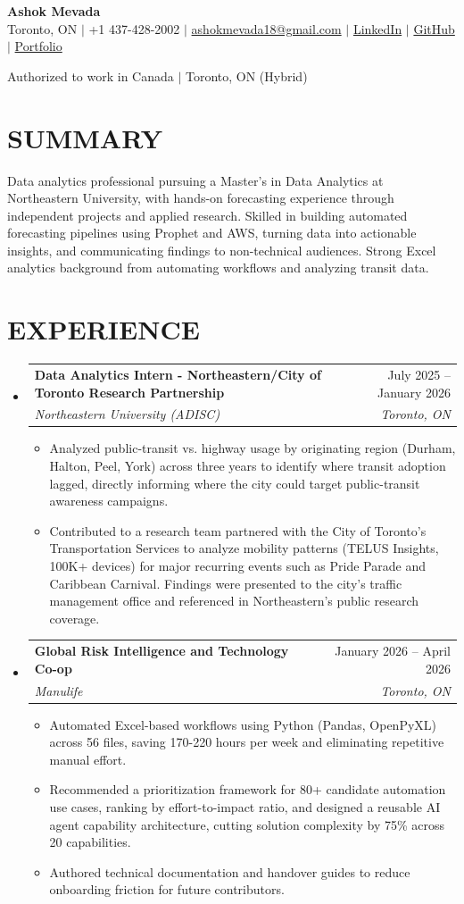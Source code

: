 \documentclass[letterpaper,11pt]{article}
\makeatletter
\newcommand{\resumeItem}[1]{\item{#1 \vspace{-2pt}}}
\newcommand{\resumeSubheading}[4]{
  \vspace{-2pt}\item
    \begin{tabular*}{0.97\textwidth}[t]{l@{\extracolsep{\fill}}r}
      \textbf{#1} & #2 \\
      \textit{#3} & \textit{#4} \\
    \end{tabular*}\vspace{-7pt}
}
\newcommand{\resumeSubHeadingListStart}{\begin{itemize}[leftmargin=0pt, label={}]}
\newcommand{\resumeSubHeadingListEnd}{\end{itemize}}
\newcommand{\resumeItemListStart}{\begin{itemize}[leftmargin=0.2in, label={$\bullet$}]}
\newcommand{\resumeItemListEnd}{\end{itemize}\vspace{-5pt}}
\makeatother
\begin{document}
\begin{center}
    {\Huge \textbf{Ashok Mevada}} \\[6pt]
    Toronto, ON $|$ +1 437-428-2002 $|$ \href{mailto:ashokmevada18@gmail.com}{ashokmevada18@gmail.com} $|$ \href{https://linkedin.com/in/ashokmevada}{LinkedIn} $|$ \href{https://github.com/Ashokmevada}{GitHub} $|$ \href{https://ashokmevada.online}{Portfolio}
\end{center}

\begin{center}
    \small Authorized to work in Canada $|$ Toronto, ON (Hybrid)
\end{center}

\section*{\MakeUppercase{Summary}}
Data analytics professional pursuing a Master's in Data Analytics at Northeastern University, with hands-on forecasting experience through independent projects and applied research. Skilled in building automated forecasting pipelines using Prophet and AWS, turning data into actionable insights, and communicating findings to non-technical audiences. Strong Excel analytics background from automating workflows and analyzing transit data.

\section{\MakeUppercase{Experience}}
\resumeSubHeadingListStart
\resumeSubheading
  {Data Analytics Intern - Northeastern/City of Toronto Research Partnership}{July 2025 -- January 2026}
  {Northeastern University (ADISC)}{Toronto, ON}
\resumeItemListStart
  \resumeItem{Analyzed public-transit vs. highway usage by originating region (Durham, Halton, Peel, York) across three years to identify where transit adoption lagged, directly informing where the city could target public-transit awareness campaigns.}
  \resumeItem{Contributed to a research team partnered with the City of Toronto's Transportation Services to analyze mobility patterns (TELUS Insights, 100K+ devices) for major recurring events such as Pride Parade and Caribbean Carnival. Findings were presented to the city's traffic management office and referenced in Northeastern's public research coverage.}
\resumeItemListEnd
\resumeSubheading
  {Global Risk Intelligence and Technology Co-op}{January 2026 -- April 2026}
  {Manulife}{Toronto, ON}
\resumeItemListStart
  \resumeItem{Automated Excel-based workflows using Python (Pandas, OpenPyXL) across 56 files, saving 170-220 hours per week and eliminating repetitive manual effort.}
  \resumeItem{Recommended a prioritization framework for 80+ candidate automation use cases, ranking by effort-to-impact ratio, and designed a reusable AI agent capability architecture, cutting solution complexity by 75\% across 20 capabilities.}
  \resumeItem{Authored technical documentation and handover guides to reduce onboarding friction for future contributors.}
\resumeItemListEnd
\resumeSubHeadingListEnd
\end{document}
